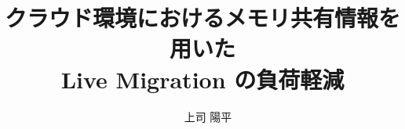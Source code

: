 
\renewcommand{\baselinestretch}{0.5}

\title{クラウド環境におけるメモリ共有情報を用いた\\ Live Migration の負荷軽減}
\author{~~上司 陽平}

\pagestyle{headings}

\def\figlabel#1{\label{fig:#1}}
\def\tablabel#1{\label{tab:#1}}
\def\chaplabel#1{\label{chap:#1}}
\def\seclabel#1{\label{sec:#1}}
\def\applabel#1{\label{app:#1}}

\def\figref#1{図~\ref{fig:#1}}
\def\tabref#1{表~\ref{tab:#1}}
\def\chapref#1{第~\ref{chap:#1}章}
\def\secref#1{第~\ref{sec:#1}節}
\def\appref#1{付録~\ref{app:#1}}

\def\labelenumi{(\theenumi)}

\jabst{} %



\maketitle
\makejabstract


